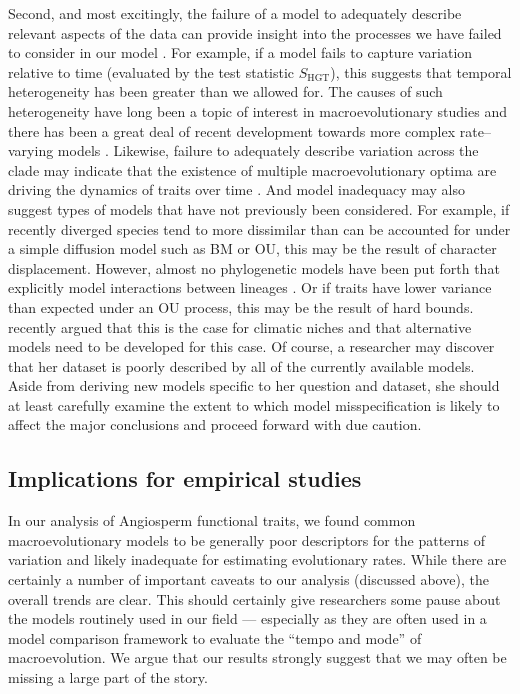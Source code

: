 \documentclass[a4paper,11pt]{article}
\begin{document}
Second, and most excitingly, the failure of a model to adequately describe relevant aspects of the data can provide insight into the processes we have failed to consider in our model \citep{Gelman2012}. For example, if a model fails to capture variation relative to time (evaluated by the test statistic $S_{\text{HGT}}$), this suggests that temporal heterogeneity has been greater than we allowed for. The causes of such heterogeneity have long been a topic of interest in macroevolutionary studies \citep[e.g.,][]{Simpson1944, Foote1997} and there has been a great deal of recent development towards more complex rate--varying models \citep[e.g.,][]{Omeara2006, Thomas2006, Eastman2011, Weir2012, RaboskyBAMM}. Likewise, failure to adequately describe variation across the clade may indicate that the existence of multiple macroevolutionary optima \citep[sensu][]{Hansen2012book} are driving the dynamics of traits over time \citep[see][for models that have been used to capture these dynamics]{Hansen1997, ButlerKing2004, Beaulieu2012, IngramMahler2013, UyedaBayou}. And model inadequacy may also suggest types of models that have not previously been considered. For example, if recently diverged species tend to more dissimilar than can be accounted for under a simple diffusion model such as BM or OU, this may be the result of character displacement. However, almost no phylogenetic models have been put forth that explicitly model interactions between lineages \citep[but see][]{NuismerHarmon}. Or if traits have lower variance than expected under an OU process, this may be the result of hard bounds. \citet{Davies2014} recently argued that this is the case for climatic niches and that alternative models need to be developed for this case. Of course, a researcher may discover that her dataset is poorly described by all of the currently available models. Aside from deriving new models specific to her question and dataset, she should at least carefully examine the extent to which model misspecification is likely to affect the major conclusions and proceed forward with due caution.
 
\subsection{Implications for empirical studies}

In our analysis of Angiosperm functional traits, we found common macroevolutionary models to be generally poor descriptors for the patterns of variation and likely inadequate for estimating evolutionary rates. While there are certainly a number of important caveats to our analysis (discussed above), the overall trends are clear. This should certainly give researchers some pause about the models routinely used in our field --- especially as they are often used in a model comparison framework to evaluate the ``tempo and mode'' of macroevolution. We argue that our results strongly suggest that we may often be missing a large part of the story.
\end{document}
